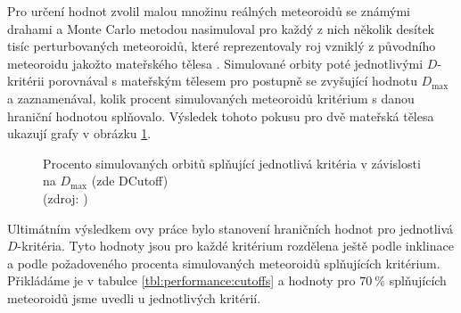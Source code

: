 \smallskip

Pro určení hodnot zvolil malou množinu reálných meteoroidů se známými drahami a Monte Carlo metodou nasimuloval pro každý z nich několik desítek tisíc perturbovaných meteoroidů, které reprezentovaly roj vzniklý z původního meteoroidu jakožto mateřského tělesa \cite{galligan}. Simulované orbity poté jednotlivými $D$-kritérii porovnával s mateřským tělesem pro postupně se zvyšující hodnotu $D_\text{max}$ a zaznamenával, kolik procent simulovaných meteoroidů kritérium s danou hraniční hodnotou splňovalo. Výsledek tohoto pokusu pro dvě mateřská tělesa ukazují grafy v obrázku \ref{img:performance:recovery}.

\begin{figure}[ht]
    \centering
    \hfill
    \caption[Procento simulovaných orbitů splňující $D$-kritéria]{
        Procento simulovaných orbitů splňující jednotlivá kritéria v závislosti na $D_\text{max}$ (zde \textsf{DCutoff})\\
        {\small (zdroj: \cite{galligan})}
    }
    \label{img:performance:recovery}
\end{figure}

\medskip

Ultimátním výsledkem \citeauthor{galligan}ovy práce bylo stanovení hraničních hodnot pro jednotlivá $D$-kritéria. Tyto hodnoty jsou pro každé kritérium rozdělena ještě podle inklinace a podle požadoveného procenta simulovaných meteoroidů splňujících kritérium. Přikládáme je v tabulce \ref{tbl:performance:cutoffs} a hodnoty pro $70\:\%$ splňujících meteoroidů jsme uvedli u jednotlivých kritérií.

